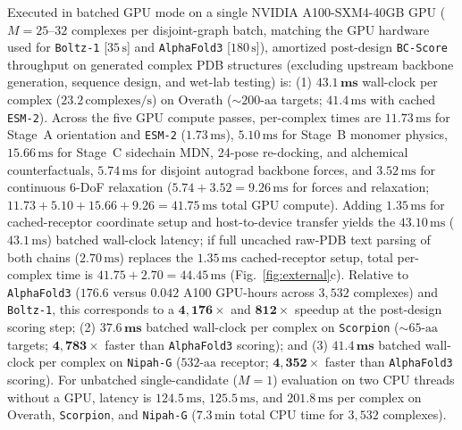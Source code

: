 \documentclass[10pt,twocolumn]{article}
\begin{document}
Executed in batched GPU mode on a single NVIDIA A100-SXM4-40GB GPU ($M=25\text{--}32$ complexes per disjoint-graph batch, matching the GPU hardware used for \texttt{Boltz-1} [$35\,\text{s}$] and \texttt{AlphaFold3} [$180\,\text{s}$]), amortized post-design \texttt{BC-Score} throughput on generated complex PDB structures (excluding upstream backbone generation, sequence design, and wet-lab testing) is: (1) $\mathbf{43.1\,\text{ms}}$ wall-clock per complex ($23.2\,\text{complexes/s}$) on Overath ($\sim 200\text{-aa}$ targets; $41.4\,\text{ms}$ with cached \texttt{ESM-2}). Across the five GPU compute passes, per-complex times are $11.73\,\text{ms}$ for Stage~A orientation and \texttt{ESM-2} ($1.73\,\text{ms}$), $5.10\,\text{ms}$ for Stage~B monomer physics, $15.66\,\text{ms}$ for Stage~C sidechain MDN, 24-pose re-docking, and alchemical counterfactuals, $5.74\,\text{ms}$ for disjoint autograd backbone forces, and $3.52\,\text{ms}$ for continuous 6-DoF relaxation ($5.74 + 3.52 = 9.26\,\text{ms}$ for forces and relaxation; $11.73 + 5.10 + 15.66 + 9.26 = 41.75\,\text{ms}$ total GPU compute). Adding $1.35\,\text{ms}$ for cached-receptor coordinate setup and host-to-device transfer yields the $43.10\,\text{ms}$ ($43.1\,\text{ms}$) batched wall-clock latency; if full uncached raw-PDB text parsing of both chains ($2.70\,\text{ms}$) replaces the $1.35\,\text{ms}$ cached-receptor setup, total per-complex time is $41.75 + 2.70 = 44.45\,\text{ms}$ (Fig.~\ref{fig:external}c). Relative to \texttt{AlphaFold3} ($176.6$ versus $0.042$ A100 GPU-hours across $3,532$ complexes) and \texttt{Boltz-1}, this corresponds to a $\mathbf{4,176\times}$ and $\mathbf{812\times}$ speedup at the post-design scoring step; (2) $\mathbf{37.6\,\text{ms}}$ batched wall-clock per complex on \texttt{Scorpion} ($\sim 65\text{-aa}$ targets; $\mathbf{4,783\times}$ faster than \texttt{AlphaFold3} scoring); and (3) $\mathbf{41.4\,\text{ms}}$ batched wall-clock per complex on \texttt{Nipah-G} ($532\text{-aa}$ receptor; $\mathbf{4,352\times}$ faster than \texttt{AlphaFold3} scoring). For unbatched single-candidate ($M=1$) evaluation on two CPU threads without a GPU, latency is $124.5\,\text{ms}$, $125.5\,\text{ms}$, and $201.8\,\text{ms}$ per complex on Overath, \texttt{Scorpion}, and \texttt{Nipah-G} ($7.3\,\text{min}$ total CPU time for $3,532$ complexes).
\end{document}
